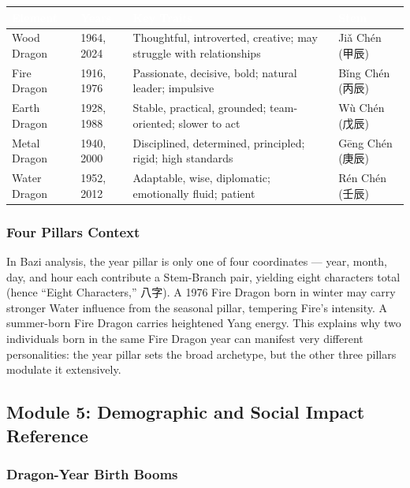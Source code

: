 \documentclass[11pt,letterpaper]{article}
\newcommand{\tableheader}[1]{\textbf{\sffamily\textcolor{white}{#1}}}
\begin{document}
\begin{center}
\begin{tabularx}{\textwidth}{L{2cm}L{2cm}XL{2.5cm}}
\toprule
{}
\tableheader{Element} & \tableheader{Years} & \tableheader{Key Traits} & \tableheader{Stem} \\
\midrule
Wood Dragon & 1964, 2024 & Thoughtful, introverted, creative; may struggle with relationships & Jiǎ Chén (甲辰) \\
Fire Dragon & 1916, 1976 & Passionate, decisive, bold; natural leader; impulsive & Bǐng Chén (丙辰) \\
Earth Dragon & 1928, 1988 & Stable, practical, grounded; team-oriented; slower to act & Wù Chén (戊辰) \\
Metal Dragon & 1940, 2000 & Disciplined, determined, principled; rigid; high standards & Gēng Chén (庚辰) \\
Water Dragon & 1952, 2012 & Adaptable, wise, diplomatic; emotionally fluid; patient & Rén Chén (壬辰) \\
\bottomrule
\end{tabularx}
\end{center}

\subsubsection{Four Pillars Context}

In Bazi analysis, the year pillar is only one of four coordinates --- year, month, day, and hour each contribute a Stem-Branch pair, yielding eight characters total (hence ``Eight Characters,'' 八字). A 1976 Fire Dragon born in winter may carry stronger Water influence from the seasonal pillar, tempering Fire's intensity. A summer-born Fire Dragon carries heightened Yang energy. This explains why two individuals born in the same Fire Dragon year can manifest very different personalities: the year pillar sets the broad archetype, but the other three pillars modulate it extensively.

\subsection{Module 5: Demographic and Social Impact Reference}

\subsubsection{Dragon-Year Birth Booms}
\end{document}
